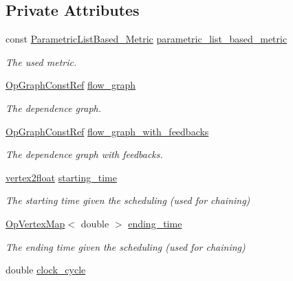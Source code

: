 \subsection*{Private Attributes}
\begin{DoxyCompactItemize}
\item 
const \hyperlink{parametric__list__based_8hpp_af0e38be9a93de210a888144f6a52e498}{Parametric\+List\+Based\+\_\+\+Metric} \hyperlink{classparametric__list__based_a9c6cc1104ca3c70cee7e55305bae7933}{parametric\+\_\+list\+\_\+based\+\_\+metric}
\begin{DoxyCompactList}\small\item\em The used metric. \end{DoxyCompactList}\item 
\hyperlink{op__graph_8hpp_a9a0b240622c47584bee6951a6f5de746}{Op\+Graph\+Const\+Ref} \hyperlink{classparametric__list__based_af8c4c141aa0606a9dcf33b234f4b98da}{flow\+\_\+graph}
\begin{DoxyCompactList}\small\item\em The dependence graph. \end{DoxyCompactList}\item 
\hyperlink{op__graph_8hpp_a9a0b240622c47584bee6951a6f5de746}{Op\+Graph\+Const\+Ref} \hyperlink{classparametric__list__based_a98268bf165c0c6b4236a7ea55b24d268}{flow\+\_\+graph\+\_\+with\+\_\+feedbacks}
\begin{DoxyCompactList}\small\item\em The dependence graph with feedbacks. \end{DoxyCompactList}\item 
\hyperlink{structvertex2float}{vertex2float} \hyperlink{classparametric__list__based_a48af95dd945034fdad7f1f0d5502c13c}{starting\+\_\+time}
\begin{DoxyCompactList}\small\item\em The starting time given the scheduling (used for chaining) \end{DoxyCompactList}\item 
\hyperlink{classOpVertexMap}{Op\+Vertex\+Map}$<$ double $>$ \hyperlink{classparametric__list__based_a0b92fb6107c2c1bdb966db10baf57a30}{ending\+\_\+time}
\begin{DoxyCompactList}\small\item\em The ending time given the scheduling (used for chaining) \end{DoxyCompactList}\item 
double \hyperlink{classparametric__list__based_af67d32b45cbe56df18bd4c1356d3ac0e}{clock\+\_\+cycle}

\end{DoxyCompactItemize}
